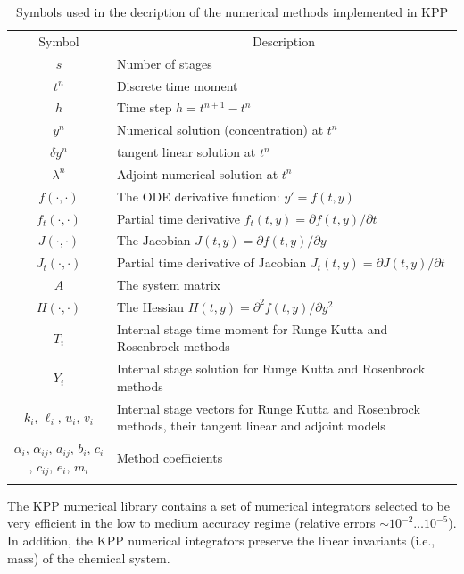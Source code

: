 \documentclass[twoside]{article}
\newcommand{\hhline}{\noalign{\vspace{1mm}}\hline\noalign{\vspace{1mm}}}
\begin{document}
\begin{table}
\begin{center}
\caption{Symbols used in the decription of the numerical methods implemented in KPP}
\label{tab:symbols}
\begin{tabular}{cp{11cm}}
\hhline
Symbol & \multicolumn{1}{c}{Description}\\
\hhline
$s$                & Number of stages\\
$t^n$              & Discrete time moment\\
$h$                & Time step   $h=t^{n+1}-t^n$\\
$y^n$              & Numerical solution (concentration) at $t^n$\\
$\delta y^n$       & tangent linear solution at $t^n$\\
$\lambda^n$        & Adjoint numerical solution at $t^n$\\
$f(\cdot,\cdot)$   & The ODE derivative function: $y'=f(t,y)$\\
$f_t(\cdot,\cdot)$ & Partial time derivative $f_t(t,y)=\partial f(t,y)/\partial t$\\
$J(\cdot,\cdot)$   & The Jacobian $J(t,y)=\partial f(t,y)/\partial y$\\
$J_t(\cdot,\cdot)$ & Partial time derivative of Jacobian $J_t(t,y)=\partial J(t,y)/\partial t$\\
$A$                & The system matrix\\
$H(\cdot,\cdot)$   & The Hessian $H(t,y)=\partial^2 f(t,y)/\partial y^2$\\
$T_i$              & Internal stage time moment for Runge Kutta and Rosenbrock methods\\
$Y_i$              & Internal stage solution for Runge Kutta and Rosenbrock methods\\
$k_i$, $\ell_i$, $u_i$, $v_i$
                   & Internal stage vectors for Runge Kutta and Rosenbrock
                     methods, their tangent linear and adjoint models\\
$\alpha_i$, $\alpha_{ij}$, $a_{ij}$, $b_i$, $c_i$, $c_{ij}$, $e_i$, $m_i$
                   & Method coefficients\\
\hhline
\end{tabular}
\end{center}
\end{table}

The KPP numerical library contains a set of numerical integrators
selected to be very efficient in the low to medium accuracy regime
(relative errors $\sim 10^{-2} \dots 10^{-5}$). In addition, the KPP
numerical integrators preserve the linear invariants (i.e., mass) of the
chemical system.
\end{document}
